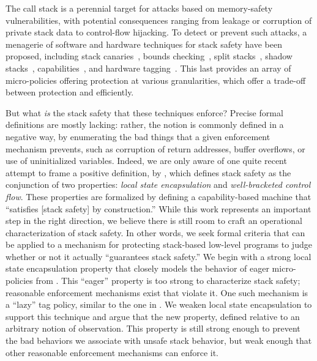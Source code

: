 \documentclass[acmsmall,review,anonymous]{acmart}\settopmatter{printfolios=true,printccs=false,printacmref=false}
\begin{document}
The call stack is a perennial target for attacks
based on memory-safety vulnerabilities, with potential consequences
ranging from leakage or corruption of private stack data to
control-flow hijacking. To detect or prevent such attacks, a menagerie of
software and hardware techniques for stack safety have been proposed,
%
including stack canaries~\citep{Cowan+98},
bounds checking~\citep{NagarakatteZMZ09,NagarakatteZMZ10,DeviettiBMZ08},
split stacks~\citep{Kuznetsov+14},
shadow stacks~\citep{Dang+15,Shanbhogue+19},
capabilities~\citep{Woodruff+14,Chisnall+15,Skorstengaard+19,Skorstengaard+19b},
and hardware tagging~\citep{DBLP:conf/sp/RoesslerD18}. \ifaftersubmission{}
\fi
This last provides an array of micro-policies offering protection at various granularities,
which offer a trade-off between protection and efficiently.

But what {\em is} the stack safety that these techniques enforce? Precise formal
definitions are mostly lacking: rather, the notion is commonly defined in a
negative way, by enumerating the bad things that a given enforcement mechanism
prevents, such as corruption of return addresses, buffer overflows, or
use of uninitialized variables.
Indeed, we are only aware of one quite recent attempt to frame a positive definition, by
\citet{Skorstengaard+19}, which defines stack safety as the conjunction of two properties:
{\em local state encapsulation} and {\em well-bracketed control flow}.
These properties are formalized by defining a capability-based machine
that ``satisfies [stack safety] by construction.''
%
While this work represents an important step in the right direction, we believe
there is still room to craft an operational characterization
of stack safety. 
In other words, we seek formal criteria that can be applied
to a mechanism for protecting stack-based low-level programs to judge
whether or not it actually ``guarantees stack safety.'' We begin with a strong
local state encapsulation property that closely models the behavior of eager
micro-policies from \citet{DBLP:conf/sp/RoesslerD18}. This ``eager'' property
is too strong to characterize stack safety; reasonable enforcement mechanisms
exist that violate it. One such mechanism is a ``lazy'' tag policy, similar to
the one in \citet{DBLP:conf/sp/RoesslerD18}. We weaken local state encapsulation
to support this technique and argue that the new property, defined relative to an
arbitrary notion of observation. This property is still strong enough to prevent
the bad behaviors we associate with unsafe stack behavior, but weak enough that
other reasonable enforcement mechanisms can enforce it.
\end{document}
